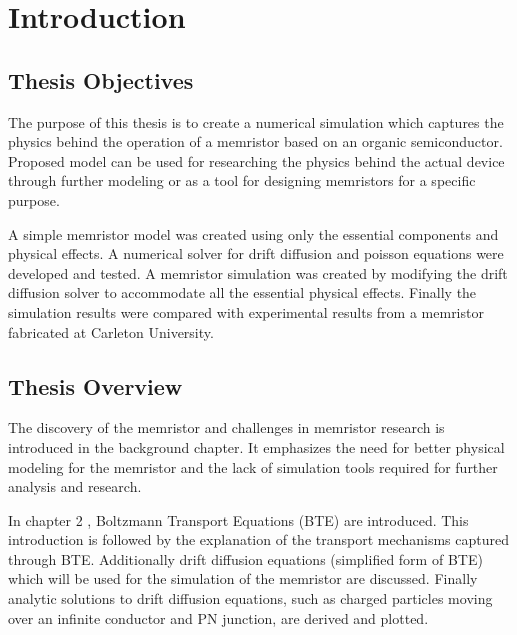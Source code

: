 
\chapter{Introduction} %


\label{Chapter1} %


\section{Thesis Objectives}
\begin{doublespace}
The purpose of this thesis is to create a numerical simulation which captures the physics behind the operation of a memristor based on an organic semiconductor. Proposed model can be used for researching the physics behind the actual device through further modeling or as a tool for designing memristors for a specific purpose. 

A simple memristor model was created using only the essential components and physical effects. A numerical solver for drift diffusion and poisson equations were developed and tested. A memristor simulation was created by modifying the drift diffusion solver to accommodate all the essential physical effects. Finally the simulation results were compared with experimental results from a memristor fabricated at Carleton University.

\section{Thesis Overview}

The discovery of the memristor and challenges in memristor research is introduced in the background chapter. It emphasizes the need for better physical modeling for the memristor and the lack of simulation tools required for further analysis and research.

In chapter 2 , Boltzmann Transport Equations (BTE) are introduced. This introduction is followed by the explanation of the transport mechanisms captured through BTE. Additionally drift diffusion equations (simplified form of BTE) which will be used for the simulation of the memristor are discussed. Finally analytic solutions to drift diffusion equations, such as charged particles moving over an infinite conductor and PN junction, are derived and plotted. 


\end{doublespace}

